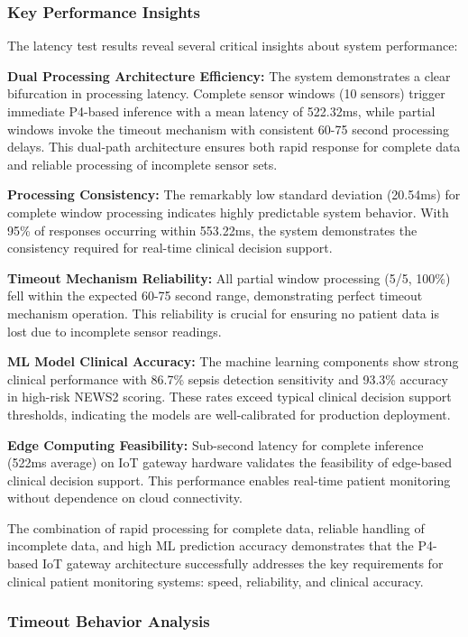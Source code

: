 \subsubsection{Key Performance Insights}

The latency test results reveal several critical insights about system performance:

\textbf{Dual Processing Architecture Efficiency:} The system demonstrates a clear bifurcation in processing latency. Complete sensor windows (10 sensors) trigger immediate P4-based inference with a mean latency of 522.32ms, while partial windows invoke the timeout mechanism with consistent 60-75 second processing delays. This dual-path architecture ensures both rapid response for complete data and reliable processing of incomplete sensor sets.

\textbf{Processing Consistency:} The remarkably low standard deviation (20.54ms) for complete window processing indicates highly predictable system behavior. With 95\% of responses occurring within 553.22ms, the system demonstrates the consistency required for real-time clinical decision support.

\textbf{Timeout Mechanism Reliability:} All partial window processing (5/5, 100\%) fell within the expected 60-75 second range, demonstrating perfect timeout mechanism operation. This reliability is crucial for ensuring no patient data is lost due to incomplete sensor readings.

\textbf{ML Model Clinical Accuracy:} The machine learning components show strong clinical performance with 86.7\% sepsis detection sensitivity and 93.3\% accuracy in high-risk NEWS2 scoring. These rates exceed typical clinical decision support thresholds, indicating the models are well-calibrated for production deployment.

\textbf{Edge Computing Feasibility:} Sub-second latency for complete inference (522ms average) on IoT gateway hardware validates the feasibility of edge-based clinical decision support. This performance enables real-time patient monitoring without dependence on cloud connectivity.

The combination of rapid processing for complete data, reliable handling of incomplete data, and high ML prediction accuracy demonstrates that the P4-based IoT gateway architecture successfully addresses the key requirements for clinical patient monitoring systems: speed, reliability, and clinical accuracy.

\subsubsection{Timeout Behavior Analysis}

